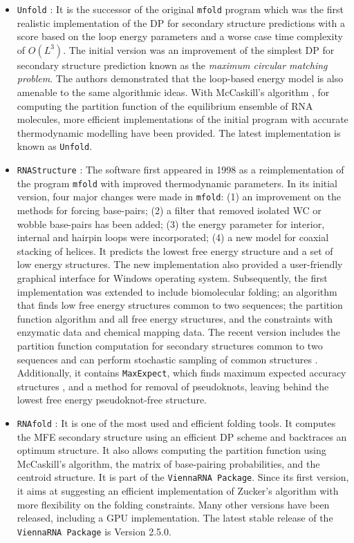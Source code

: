 \begin{itemize}
	\item \texttt{Unfold} \cite{zuker1981optimal, zuker1984rna}: It is the successor of the original  \texttt{mfold} program which was the first realistic implementation of the \ac{DP} for secondary structure predictions with a score based on the loop energy parameters and a worse case time complexity of $O(L^3)$. The initial version was an improvement of the simplest \ac{DP} for secondary structure prediction known as the \textit{maximum circular matching problem}. The authors demonstrated that the loop-based energy model is also amenable to the same algorithmic ideas. With McCaskill's algorithm \cite{mccaskill1990equilibrium}, for computing the partition function of the equilibrium ensemble of \ac{RNA} molecules, more efficient implementations of the initial program with accurate thermodynamic modelling have been provided. The latest implementation is known as \texttt{Unfold}.
	
	\item \texttt{RNAStructure} \cite{matthews1998updated,reuter2010rnastructure}: The software first appeared in 1998 as a reimplementation of the program \texttt{mfold} with improved thermodynamic parameters. In its initial version, four major changes were made in \texttt{mfold}: (1) an improvement on the methods for forcing base-pairs; (2) a filter that removed isolated \ac{WC} or wobble base-pairs has been added; (3) the energy parameter for interior, internal and hairpin loops were incorporated; (4) a new model for coaxial stacking of helices. It predicts the lowest free energy structure and a set of low energy structures. The new implementation also provided a user-friendly graphical interface for Windows operating system. Subsequently, the first implementation was extended to include biomolecular folding; an algorithm that finds low free energy structures common to two sequences; the partition function algorithm and all free energy structures, and the constraints with enzymatic data and chemical mapping data. The recent version includes the partition function computation for secondary structures common to two sequences and can perform stochastic sampling of common structures \cite{harmanci2009stochastic}. Additionally, it contains \texttt{MaxExpect}, which finds maximum expected accuracy structures \cite{lu2009improved}, and a method for removal of pseudoknots, leaving behind the lowest free energy pseudoknot-free structure. 
	
	\item \texttt{RNAfold} \cite{hofacker1994fast,lorenz11_vienn_packag}: It is one of the most used and efficient folding tools. It computes the \ac{MFE} secondary structure using an efficient \ac{DP} scheme and backtraces an optimum structure. It also allows computing the partition function using McCaskill's algorithm, the matrix of base-pairing probabilities, and the centroid structure. It is part of the \texttt{ViennaRNA Package}. Since its first version, it aims at suggesting an efficient implementation of Zucker's algorithm with more flexibility on the folding constraints. Many other versions have been released, including a \ac{GPU} implementation. The latest stable release of the \texttt{ViennaRNA Package} is Version 2.5.0.
	

\end{itemize}
